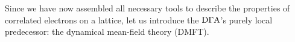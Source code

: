 \documentclass[../../main.tex]{subfiles}
\begin{document}
\\\\
Since we have now assembled all necessary tools to describe the properties of correlated electrons on a lattice, let us introduce the $\text{D}\Gamma\text{A}$'s purely local predecessor: the dynamical mean-field theory (DMFT).
\end{document}

